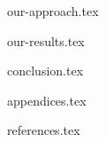 \documentclass[a4paper,11px]{article}
\begin{document}
{our-approach.tex}

\newpage



{our-results.tex}

\newpage



{conclusion.tex}

\newpage



{appendices.tex}

\newpage




{references.tex}
\end{document}
